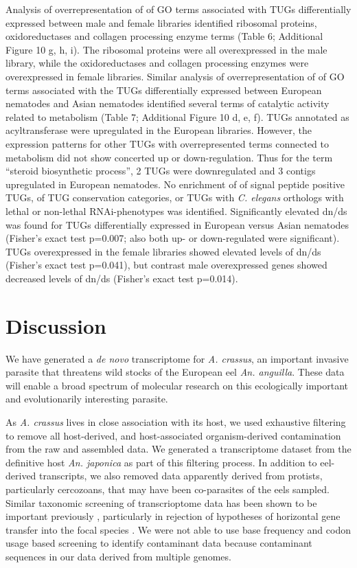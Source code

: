 \documentclass[10pt]{bmc_article}
\newenvironment{bmcformat}{\begin{raggedright}\baselineskip20pt\sloppy\setboolean{publ}{false}}{\end{raggedright}\baselineskip20pt\sloppy}
\begin{document}
\begin{bmcformat}
Analysis of overrepresentation of of GO terms associated with TUGs
differentially expressed between male and female libraries identified
ribosomal proteins, oxidoreductases and collagen processing enzyme
terms (Table 6; Additional Figure 10 g, h, i). The ribosomal proteins were
all overexpressed in the male library, while the oxidoreductases and
collagen processing enzymes were overexpressed in female
libraries. Similar analysis of overrepresentation of of GO terms
associated with the TUGs differentially expressed between European
nematodes and Asian nematodes identified several terms of catalytic
activity related to metabolism (Table 7; Additional Figure 10
d, e, f). TUGs annotated as acyltransferase were upregulated in the
European libraries. However, the expression patterns for other TUGs
with overrepresented terms connected to metabolism did not show
concerted up or down-regulation. Thus for the term ``steroid
biosynthetic process'', 2 TUGs were downregulated and 3 contigs
upregulated in European nematodes. No enrichment of of signal peptide
positive TUGs, of TUG conservation categories, or TUGs with
\textit{C. elegans} orthologs with lethal or non-lethal
RNAi-phenotypes was identified. Significantly elevated dn/ds was found
for TUGs differentially expressed in European versus Asian nematodes
(Fisher's exact test p=0.007; also both up- or down-regulated were
significant). TUGs overexpressed in the female libraries showed
elevated levels of dn/ds (Fisher's exact test p=0.041), but contrast
male overexpressed genes showed decreased levels of dn/ds (Fisher's
exact test p=0.014).


\section*{Discussion}

We have generated a \textit{de novo} transcriptome for
\textit{A. crassus}, an important invasive parasite that threatens wild
stocks of the European eel \textit{An. anguilla}. These data will
enable a broad spectrum of molecular research on this ecologically
important and evolutionarily interesting parasite. 

As \textit{A. crassus} lives in close association with its host, we
used exhaustive filtering to remove all host-derived, and
host-associated organism-derived contamination from the raw and
assembled data. We generated a transcriptome dataset from the
definitive host \textit{An. japonica} as part of this filtering
process. In addition to eel-derived transcripts, we also removed data
apparently derived from protists, particularly cercozoans, that may
have been co-parasites of the eels sampled. Similar taxonomic
screening of transcrioptome data has been shown to be important
previously \cite{pmid21138572}, particularly in rejection of
hypotheses of horizontal gene transfer into the focal species
\cite{pmid20386959}. We were not able to use base frequency and codon
usage based screening to identify contaminant data \cite{pmid20034392,
  pmid17218127} because contaminant sequences in our data derived from
multiple genomes.



\end{bmcformat}
\end{document}
